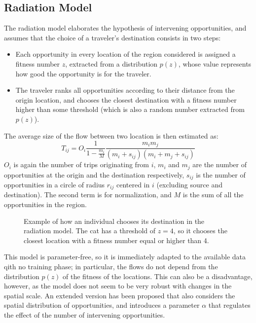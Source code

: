 \subsection{Radiation Model}
The radiation model elaborates the hypothesis of intervening opportunities, and assumes that the choice of a traveler's destination consists in two steps:
\begin{itemize}
    \item Each opportunity in every location of the region considered is assigned a fitness number $z$, extracted from a distribution $p(z)$, whose value represents how good the opportunity is for the traveler.
    \item The traveler ranks all opportunities according to their distance from the origin location, and chooses the closest destination with a fitness number higher than some threshold (which is also a random number extracted from $p(z)$). 
\end{itemize}
The average size of the flow between two location is then estimated as:
\begin{equation*}
    T_{ij} = O_i \frac{1}{1 - \frac{m_i}{M}} \frac{m_i m_j}{(m_i + s_{ij}) (m_i + m_j + s_{ij})}
\end{equation*}
$O_i$ is again the number of trips originating from $i$, $m_i$ and $m_j$ are the number of opportunities at the origin and the destination respectively, $s_{ij}$ is the number of opportunities in a circle of radius $r_{ij}$ centered in $i$ (excluding source and destination). The second term is for normalization, and $M$ is the sum of all the opportunities in the region.

\begin{figure}[H]
    \centering
    
    \caption{Example of how an individual chooses its destination in the radiation model. The cat has a threshold of $z=4$, so it chooses the closest location with a fitness number equal or higher than 4.}
\end{figure}

This model is parameter-free, so it is immediately adapted to the available data qith no training phase; in particular, the flows do not depend from the distribution $p(z)$ of the fitness of the locations. This can also be a disadvantage, however, as the model does not seem to be very robust with changes in the spatial scale. An extended version has been proposed that also considers the spatial distribution of opportunities, and introduces a parameter $\alpha$ that regulates the effect of the number of intervening opportunities.

